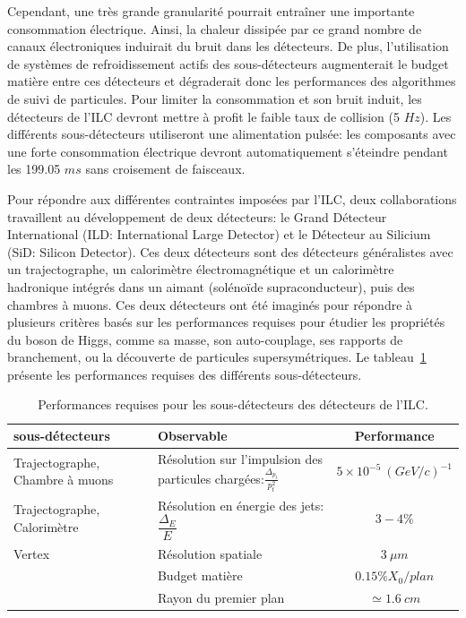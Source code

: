 Cependant, une très grande granularité pourrait entraîner une importante consommation électrique. Ainsi, la chaleur dissipée par ce grand nombre de canaux électroniques induirait du bruit dans les détecteurs. De plus, l'utilisation de systèmes de refroidissement actifs des sous-détecteurs augmenterait le budget matière entre ces détecteurs et dégraderait donc les performances des algorithmes de suivi de particules. Pour limiter la consommation et son bruit induit, les détecteurs de l'ILC devront mettre à profit le faible taux de collision (5 $Hz$). Les différents sous-détecteurs utiliseront une alimentation pulsée: les composants avec une forte consommation électrique devront automatiquement s'éteindre pendant les 199.05 $ms$ sans croisement de faisceaux. 

Pour répondre aux différentes contraintes imposées par l'ILC, deux collaborations travaillent au développement de deux détecteurs: le Grand Détecteur International (ILD: International Large Detector) et le Détecteur au Silicium (SiD: Silicon Detector). Ces deux détecteurs sont des détecteurs généralistes avec un trajectographe, un calorimètre électromagnétique et un calorimètre hadronique intégrés dans un aimant (solénoïde supraconducteur), puis des chambres à muons. Ces deux détecteurs ont été imaginés pour répondre à plusieurs critères basés sur les performances requises pour étudier les propriétés du boson de Higgs, comme sa masse, son auto-couplage, ses rapports de branchement, ou la découverte de particules supersymétriques. Le tableau~\ref{tab.ilc-det-perf} présente les performances requises des différents sous-détecteurs.
\begin{table}[!ht]
  \begin{center}
    \begin{tabular}{>{\centering}m{5cm} | >{\centering}m{6cm} | c }
      \hline
      \rowcolor{black!20!white} sous-détecteurs & Observable & Performance \\
      \hline
      \rowcolor{black!5!white} Trajectographe, \newline Chambre à muons & Résolution sur l'impulsion des particules chargées:\newline $\frac{\Delta_{p_t}}{p_t^2}$ & $5\times10^{-5}\ (GeV/c)^{-1}$\\
      \hline
      \rowcolor{black!5!white} Trajectographe, \newline Calorimètre & Résolution en énergie des jets:\newline $\dfrac{\Delta_{E}}{E}$ & $3-4\%$\\
      \hline
      \rowcolor{black!5!white} Vertex & Résolution spatiale & $3\ \mu m$\\
      \rowcolor{black!5!white} $ $ & Budget matière & $0.15\% X_0/plan$\\
      \rowcolor{black!5!white} $ $ & Rayon du premier plan & $\simeq 1.6\ cm$\\
    \end{tabular}
  \end{center}  
  \caption{Performances requises pour les sous-détecteurs des détecteurs de l'ILC.}
  \label{tab.ilc-det-perf}
\end{table}



